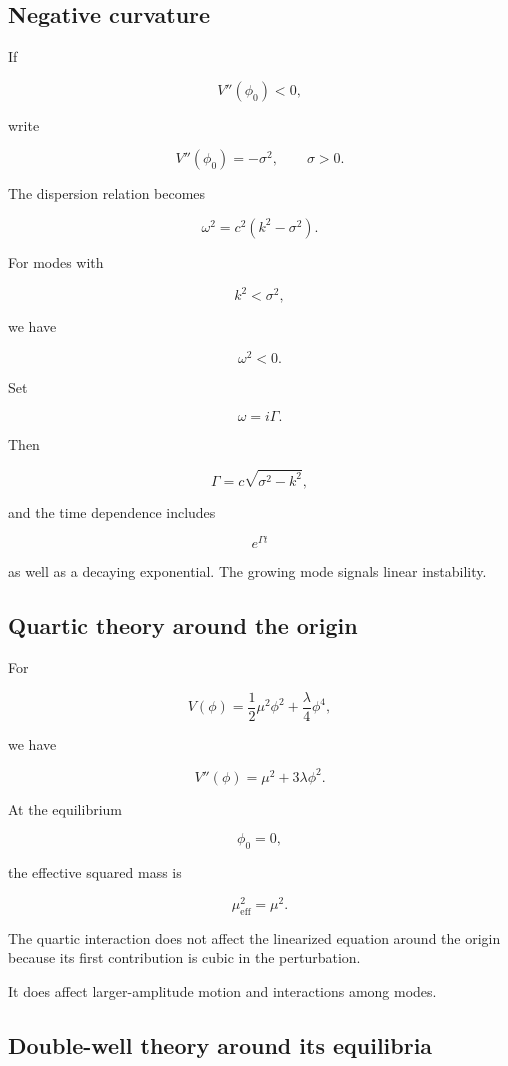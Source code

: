 \subsection{Negative curvature}

If

\[
V''(\phi_{0})<0,
\]

write

\[
V''(\phi_{0})=-\sigma^{2},
\qquad
\sigma>0.
\]

The dispersion relation becomes

\[
\omega^{2}
=
c^{2}(k^{2}-\sigma^{2}).
\]

For modes with

\[
k^{2}<\sigma^{2},
\]

we have

\[
\omega^{2}<0.
\]

Set

\[
\omega=i\Gamma.
\]

Then

\[
\Gamma
=
c\sqrt{\sigma^{2}-k^{2}},
\]

and the time dependence includes

\[
\boxed{
e^{\Gamma t}}
\]

as well as a decaying exponential. The growing mode signals linear instability.

\subsection{Quartic theory around the origin}

For

\[
V(\phi)
=
\frac{1}{2}\mu^{2}\phi^{2}
+
\frac{\lambda}{4}\phi^{4},
\]

we have

\[
V''(\phi)
=
\mu^{2}
+
3\lambda\phi^{2}.
\]

At the equilibrium

\[
\phi_{0}=0,
\]

the effective squared mass is

\[
\boxed{
\mu_{\mathrm{eff}}^{2}=\mu^{2}
}.
\]

The quartic interaction does not affect the linearized equation around the origin because its first contribution is cubic in the perturbation.

It does affect larger-amplitude motion and interactions among modes.

\subsection{Double-well theory around its equilibria}

